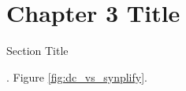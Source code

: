 \chapter{Chapter 3 Title}
\begin{section}{Section Title}

\cite{Maldacena:1997re,joesbook}. Figure \ref{fig:dc_vs_synplify}.

\begin{figure}[t]

\end{figure}

\end{section}
